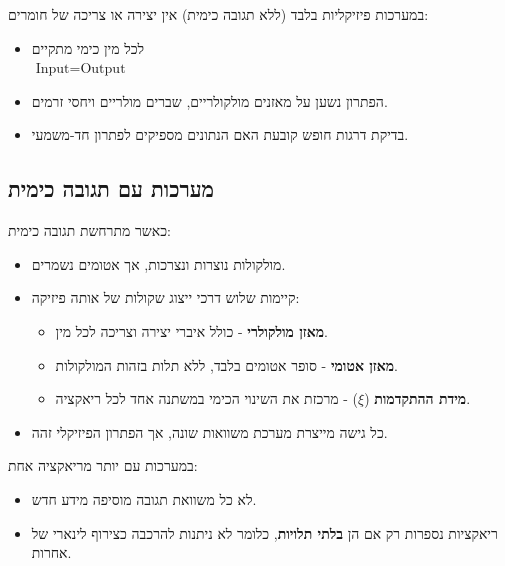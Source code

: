 \documentclass[
  hebrew,
  letterpaper,
  DIV=11,
  numbers=noendperiod]{scrreprt}
\providecommand{\tightlist}{%
  \setlength{\itemsep}{0pt}\setlength{\parskip}{0pt}}
\begin{document}
במערכות פיזיקליות בלבד (ללא תגובה כימית) אין יצירה או צריכה של חומרים:

\begin{itemize}
\tightlist
\item
  לכל מין כימי מתקיים\\
  \(\text{Input} = \text{Output}\)\\
\item
  הפתרון נשען על מאזנים מולקולריים, שברים מולריים ויחסי זרמים.\\
\item
  בדיקת דרגות חופש קובעת האם הנתונים מספיקים לפתרון חד-משמעי.
\end{itemize}

\subsection{מערכות עם תגובה
כימית}\label{ux5deux5e2ux5e8ux5dbux5d5ux5ea-ux5e2ux5dd-ux5eaux5d2ux5d5ux5d1ux5d4-ux5dbux5d9ux5deux5d9ux5ea}

כאשר מתרחשת תגובה כימית:

\begin{itemize}
\tightlist
\item
  מולקולות נוצרות ונצרכות, אך אטומים נשמרים.\\
\item
  קיימות שלוש דרכי ייצוג שקולות של אותה פיזיקה:

  \begin{itemize}
  \tightlist
  \item
    \textbf{מאזן מולקולרי} - כולל איברי יצירה וצריכה לכל מין.
  \item
    \textbf{מאזן אטומי} - סופר אטומים בלבד, ללא תלות בזהות המולקולות.
  \item
    \textbf{מידת ההתקדמות} (\(\xi\)) - מרכזת את השינוי הכימי במשתנה אחד
    לכל ריאקציה.
  \end{itemize}
\item
  כל גישה מייצרת מערכת משוואות שונה, אך הפתרון הפיזיקלי זהה.
\end{itemize}

במערכות עם יותר מריאקציה אחת:

\begin{itemize}
\tightlist
\item
  לא כל משוואת תגובה מוסיפה מידע חדש.
\item
  ריאקציות נספרות רק אם הן \textbf{בלתי תלויות}, כלומר לא ניתנות להרכבה
  כצירוף לינארי של אחרות.
\end{itemize}
\end{document}

